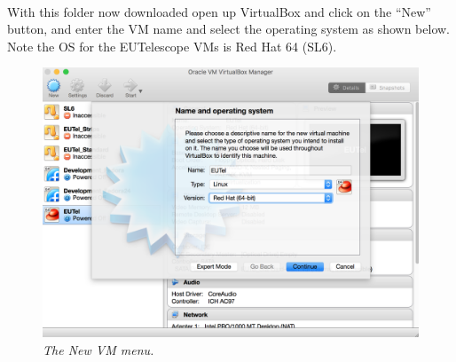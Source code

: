 \documentclass[11pt]{article}
\begin{document}
\paragraph{}
With this folder now downloaded open up VirtualBox and click on the ``New'' button, and enter the VM name and select the operating system as shown below. Note the OS for the EUTelescope VMs is Red Hat 64 (SL6).
\begin{figure}[!ht]
	\centering
	\includegraphics[scale=0.3]{new_pc.png}
	\caption{\textit{The New VM menu.}}
\end{figure}
\end{document}
